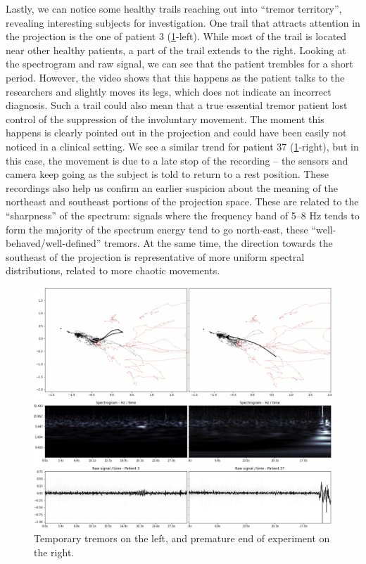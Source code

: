 Lastly, we can notice some healthy trails reaching out into ``tremor territory'', revealing interesting subjects for investigation. One trail that attracts attention in the projection is the one of patient 3 (\cref{fig:exp1-337}-left). While most of the trail is located near other healthy patients, a part of the trail extends to the right. Looking at the spectrogram and raw signal, we can see that the patient trembles for a short period. However, the video shows that this happens as the patient talks to the researchers and slightly moves its legs, which does not indicate an incorrect diagnosis.
Such a trail could also mean that a true essential tremor patient lost control of the suppression of the involuntary movement. The moment this happens is clearly pointed out in the projection and could have been easily not noticed in a clinical setting. We see a similar trend for patient 37 (\cref{fig:exp1-337}-right), but in this case, the movement is due to a late stop of the recording -- the sensors and camera keep going as the subject is told to return to a rest position. These recordings also help us confirm an earlier suspicion about the meaning of the northeast and southeast portions of the projection space. These are related to the ``sharpness'' of the spectrum: signals where the frequency band of 5--8 Hz tends to form the majority of the spectrum energy tend to go north-east, these ``well-behaved/well-defined'' tremors. At the same time, the direction towards the southeast of the projection is representative of more uniform spectral distributions, related to more chaotic movements.

\begin{figure}[ht]
\centering
\includegraphics[width=\linewidth]{figures/nemo/exp1-337.png}
\caption{Temporary tremors on the left, and premature end of experiment on the right.}
\label{fig:exp1-337}
\end{figure}

